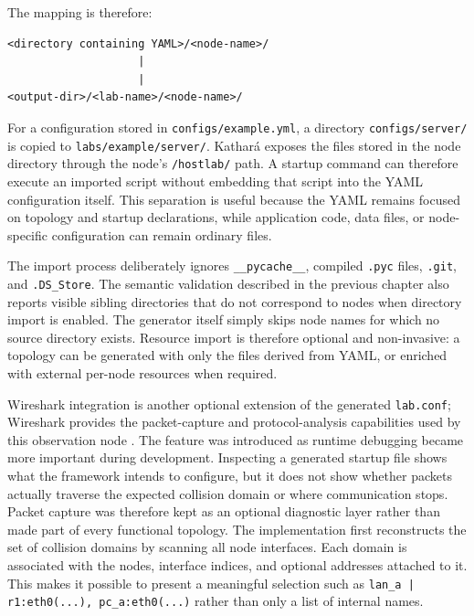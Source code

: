 The mapping is therefore:

\begin{lstlisting}[caption={Mapping used when node-specific resources are imported.},label={lst:resource-import-map}]
<directory containing YAML>/<node-name>/ 
                    |
                    |
<output-dir>/<lab-name>/<node-name>/
\end{lstlisting}

For a configuration stored in \texttt{configs/example.yml}, a directory
\texttt{configs/server/} is copied to
\texttt{labs/example/server/}. Kathar\'a exposes the files stored in the node
directory through the node's \texttt{/hostlab/} path. A startup command can
therefore execute an imported script without embedding that script into the
YAML configuration itself. This separation is useful because the YAML remains
focused on topology and startup declarations, while application code, data
files, or node-specific configuration can remain ordinary files.

The import process deliberately ignores \texttt{\_\_pycache\_\_}, compiled
\texttt{.pyc} files, \texttt{.git}, and \texttt{.DS\_Store}. The semantic
validation described in the previous chapter also reports visible sibling
directories that do not correspond to nodes when directory import is enabled.
The generator itself simply skips node names for which no source directory
exists. Resource import is therefore optional and non-invasive: a topology can
be generated with only the files derived from YAML, or enriched with external
per-node resources when required.

Wireshark integration is another optional extension of the generated
\texttt{lab.conf}; Wireshark provides the packet-capture and protocol-analysis
capabilities used by this observation node \cite{wireshark_user_guide}. The
feature was introduced as runtime debugging became more important during
development. Inspecting a generated startup file shows what the framework
intends to configure, but it does not show whether packets actually traverse
the expected collision domain or where communication stops. Packet capture was
therefore kept as an optional diagnostic layer rather than made part of every
functional topology. The implementation first reconstructs the set of collision
domains by scanning all node interfaces. Each domain is associated with the
nodes, interface indices, and optional addresses attached to it. This makes it
possible to present a meaningful selection such as
\texttt{lan\_a | r1:eth0(...), pc\_a:eth0(...)} rather than only a list of
internal names.

